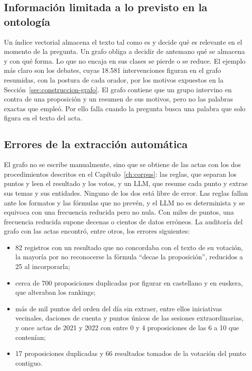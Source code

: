 \documentclass[11pt, a4paper]{report}
\begin{document}
	\subsection{Información limitada a lo previsto en la ontología}

	Un índice vectorial almacena el texto tal como es y decide qué es relevante en
	el momento de la pregunta. Un grafo obliga a decidir de antemano qué se
	almacena y con qué forma. Lo que no encaja en sus clases se pierde o se
	reduce. El ejemplo más claro son los debates, cuyas 18.581
	intervenciones figuran en el grafo resumidas, con la postura de cada orador, por los
	motivos expuestos en la Sección~\ref{sec:construccion-grafo}. El grafo contiene que un grupo intervino en
	contra de una proposición y un resumen de sus motivos, pero no las
	palabras exactas que empleó. Por ello falla cuando la pregunta busca una
	palabra que solo figura en el texto del acta.

	\subsection{Errores de la extracción automática}

	El grafo no se escribe manualmente, sino que se obtiene de las actas con los
	dos procedimientos descritos en el Capítulo~\ref{ch:corpus}: las reglas, que
	separan los puntos y leen el resultado y los votos, y un LLM, que resume cada
	punto y extrae sus temas y sus entidades. Ninguno de los dos está libre de
	error. Las reglas fallan ante los formatos y las fórmulas que no prevén, y el
	LLM no es determinista y se equivoca con una frecuencia reducida pero no nula.
	Con miles de puntos, una frecuencia reducida supone decenas o cientos de datos
	erróneos. La auditoría del grafo con las actas encontró, entre otros, los
	errores siguientes:

	\begin{itemize}
		\item 82 registros con un resultado que no concordaba con el texto de su
		votación, la mayoría por no reconocerse la fórmula ``decae la
		proposición'', reducidos a 25 al incorporarla;
		\item cerca de 700 proposiciones duplicadas por figurar en castellano y en
		euskera, que alteraban los rankings;
		\item más de mil puntos del orden del día sin extraer, entre ellos
		iniciativas vecinales, daciones de cuenta y puntos únicos de las sesiones
		extraordinarias, y once actas de 2021 y 2022 con entre 0 y 4 proposiciones
		de las 6 a 10 que contenían;
		\item 17 proposiciones duplicadas y 66 resultados tomados de la votación
		del punto contiguo.
	\end{itemize}
\end{document}
